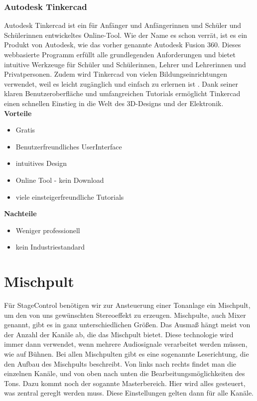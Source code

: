 \subsubsection{Autodesk Tinkercad}
Autodesk Tinkercad ist ein für Anfänger und Anfängerinnen und Schüler und Schülerinnen entwickeltes Online-Tool. Wie der Name es schon verrät, ist es ein Produkt von Autodesk, wie das vorher genannte Autodesk Fusion 360. Dieses webbasierte Programm erfüllt alle grundlegenden Anforderungen und bietet intuitive Werkzeuge für Schüler und Schülerinnen, Lehrer und Lehrerinnen und Privatpersonen. Zudem wird Tinkercad von vielen Bildungseinrichtungen verwendet, weil es leicht zugänglich und einfach zu erlernen ist \parencite{Tinkercad}. Dank seiner klaren Benutzeroberfläche und umfangreichen Tutorials ermöglicht Tinkercad einen schnellen Einstieg in die Welt des 3D-Designs und der Elektronik. \\


\textbf{Vorteile}
\begin{itemize}
	\item Gratis
	\item Benutzerfreundliches UserInterface
	\item intuitives Design
	\item Online Tool - kein Download 	
	\item viele einsteigerfreundliche Tutorials \parencite{TinkercadReviews}
\end{itemize}

\textbf{Nachteile}
\begin{itemize}
	\item Weniger professionell
	\item kein Industriestandard \parencite{TinkercadReviews}
\end{itemize}

\section{Mischpult}
Für StageControl benötigen wir zur Ansteuerung einer Tonanlage ein Mischpult, um den von uns gewünschten Stereoeffekt zu erzeugen. Mischpulte, auch Mixer genannt, gibt es in ganz unterschiedlichen Größen. Das Ausmaß hängt meist von der Anzahl der Kanäle ab, die das Mischpult bietet. Diese technologie wird immer dann verwendet, wenn mehrere Audiosignale verarbeitet werden müssen, wie auf Bühnen. \parencite{MischpultInformation} Bei allen Mischpulten gibt es eine sogenannte Leserichtung, die den Aufbau des Mischpults beschreibt. Von links nach rechts findet man die einzelnen Kanäle, und von oben nach unten die Bearbeitungsmöglichkeiten des Tons. Dazu kommt noch der sogannte Masterbereich. Hier wird alles gesteuert, was zentral gereglt werden muss. Diese Einstellungen gelten dann für alle Kanäle.  \parencite{MischpultMaster} \\


